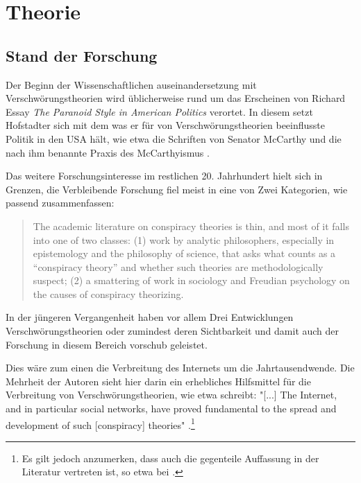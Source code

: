 \section{Theorie}


\subsection{Stand der Forschung}

Der Beginn der Wissenschaftlichen auseinandersetzung mit Verschwörungstheorien wird üblicherweise rund um das Erscheinen von Richard \textcite{hofstadter_2008} Essay \textit{The Paranoid Style in American Politics} verortet.
In diesem setzt Hofstadter sich mit dem was er für von Verschwörungstheorien beeinflusste Politik in den USA hält, wie etwa die Schriften von Senator McCarthy und die nach ihm benannte Praxis des McCarthyismus .

Das weitere Forschungsinteresse im restlichen 20. Jahrhundert hielt sich in Grenzen, die Verbleibende Forschung fiel meist in eine von Zwei Kategorien, wie \textcite{sunstein_2008} passend zusammenfassen:

\begin{quotation}
    The academic literature on conspiracy theories is thin, and most of it falls into one 
    of two classes: (1) work by analytic philosophers, especially in epistemology and the 
    philosophy of science, that asks what counts as a “conspiracy theory” and whether such theories are methodologically suspect; (2) a smattering of work in sociology and Freudian psychology on the causes of conspiracy theorizing. \parencite[][2]{sunstein_2008}
\end{quotation}

In der jüngeren Vergangenheit haben vor allem Drei Entwicklungen Verschwörungstheorien oder zumindest deren Sichtbarkeit und damit auch der Forschung in diesem Bereich vorschub geleistet.

Dies wäre zum einen die Verbreitung des Internets um die Jahrtausendwende.
Die Mehrheit der Autoren sieht hier darin ein erhebliches Hilfsmittel für die Verbreitung von Verschwörungstheorien, wie etwa \textcite{stano_2020} schreibt: "[...] The Internet, and in particular social networks, have proved fundamental to the spread and development of such [conspiracy] theories" \parencite[][492]{stano_2020}.\footnote{Es gilt jedoch anzumerken, dass auch die gegenteile Auffassung in der Literatur vertreten ist, so etwa bei \textcite{clarke_2007}.}

